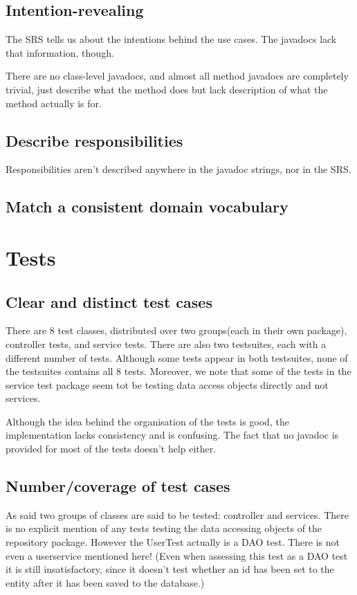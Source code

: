 \documentclass[a4wide]{article}
\begin{document}
\subsection{Intention-revealing}
The SRS tells us about the intentions behind the use cases. The javadocs lack that information, though.

There are no class-level javadocs, and almost all method javadocs are completely trivial, just describe what the method
does but lack description of what the method actually is for.
\subsection{Describe responsibilities}
Responsibilities aren't described anywhere in the javadoc strings, nor in the SRS.
\subsection{Match a consistent domain vocabulary}
\section{Tests}
\subsection{Clear and distinct test cases}
There are 8 test classes, distributed over two groups(each in their own package), controller tests, and service tests. There are also two testsuites, each with a different number of tests. Although some tests appear in both testsuites, none of the testsuites contains all 8 tests. Moreover, we note that some of the tests in the service test package seem tot be testing data access objects directly and not services. 

Although the idea behind the organisation of the tests is good, the implementation lacks consistency and is confusing. The fact that no javadoc is provided for most of the tests doesn't help either. 
\subsection{Number/coverage of test cases}
As said two groups of classes are said to be tested: controller and services. There is no explicit mention of any tests testing the data accessing objects of the repository package. However the UserTest actually is a DAO test. There is not even a userservice mentioned here! (Even when assessing this test as a DAO test it is still insatisfactory, since it doesn't test whether an id has been set to the entity after it has been saved to the database.)
\end{document}
